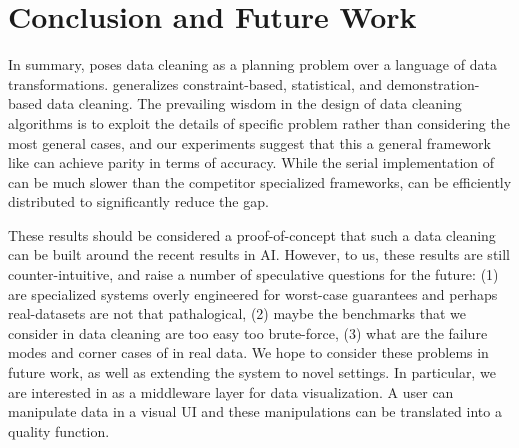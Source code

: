\section{Conclusion and Future Work}
In summary, \sys poses data cleaning as a planning problem over a language of data transformations.
\sys generalizes constraint-based, statistical, and demonstration-based data cleaning.
The prevailing wisdom in the design of data cleaning algorithms is to exploit the details of specific problem rather than considering the most general cases, and our experiments suggest that this a general framework like \sys can achieve parity in terms of accuracy.
While the serial implementation of \sys can be much slower than the competitor specialized frameworks, \sys can be efficiently distributed to significantly reduce the gap.

These results should be considered a proof-of-concept that such a data cleaning \sys can be built around the recent results in AI. 
However, to us, these results are still counter-intuitive, and raise a number of speculative questions for the future: (1) are specialized systems overly engineered for worst-case guarantees and perhaps real-datasets are not that pathalogical, (2) maybe the benchmarks that we consider in data cleaning are too easy too brute-force, (3) what are the failure modes and corner cases of \sys in real data.
We hope to consider these problems in future work, as well as extending the system to novel settings.
In particular, we are interested in \sys as a middleware layer for data visualization.
A user can manipulate data in a visual UI and these manipulations can be translated into a quality function.

